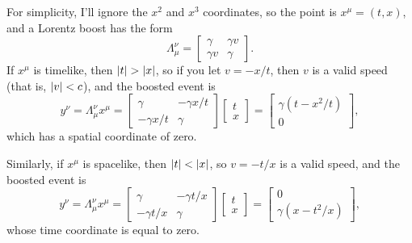 \documentclass{article}
\begin{document}
\bigskip
\par
\begin{prob}
\end{prob}
For simplicity, I'll ignore the $x^2$ and $x^3$ coordinates, so the point is $x^\mu = (t, x)$, and a Lorentz boost has the form
\[ \Lambda_\mu^\nu = \begin{bmatrix}
    \gamma & \gamma v \\
    \gamma v & \gamma
\end{bmatrix}. \]
If $x^\mu$ is timelike, then $\left\lvert t \right\rvert>\left\lvert x \right\rvert$, so if you let $v = -x/t$, then $v$ is a valid speed (that is, $\left\lvert v \right\rvert<c$), and the boosted event is
\[ y^\nu = \Lambda_\mu^\nu x^\mu = \begin{bmatrix}
    \gamma & -\gamma x / t \\
    -\gamma x / t & \gamma
\end{bmatrix} \begin{bmatrix}
    t \\
    x
\end{bmatrix} = \begin{bmatrix}
    \gamma (t-x^2/t) \\
    0
\end{bmatrix}, \]
which has a spatial coordinate of zero.
\par
Similarly, if $x^\mu$ is spacelike, then $\left\lvert t \right\rvert<\left\lvert x \right\rvert$, so $v = -t/x$ is a valid speed, and the boosted event is
\[ y^\nu = \Lambda_\mu^\nu x^\mu = \begin{bmatrix}
    \gamma & -\gamma t / x \\
    -\gamma t / x & \gamma
\end{bmatrix} \begin{bmatrix}
    t \\
    x
\end{bmatrix} = \begin{bmatrix}
    0 \\
    \gamma (x - t^2/x)
\end{bmatrix}, \]
whose time coordinate is equal to zero.
\end{document}

